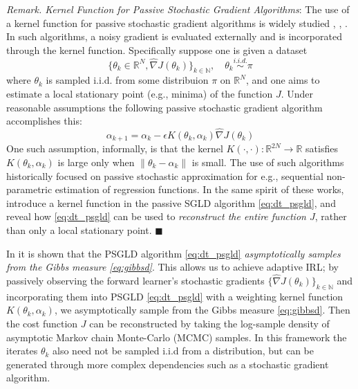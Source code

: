 \documentclass[journal,onecolumn]{IEEEtran}
\newcommand{\alk}{\alpha_k}
\newcommand{\alkk}{\alpha_{k+1}}
\newcommand{\thk}{\theta_k}
\newcommand{\step}{\epsilon}
\newcommand{\gradn}{\hat{\nabla}}
\newcommand{\rew}{J}
\newcommand{\reals}{\mathbb{R}}
\newcommand{\dimn}{N}
\newcommand{\N}{\mathbb{N}}
\begin{document}
\vspace{0.2cm}
\textit{Remark. Kernel Function for Passive Stochastic Gradient Algorithms}: The use of a kernel function for passive stochastic gradient algorithms is widely studied \cite{revesz1977apply} \cite{hardle1987nonparametric}, \cite{nazin1989passive}, \cite{YY96}. In such algorithms, a noisy gradient is evaluated externally and is incorporated through the kernel function. Specifically suppose one is given a dataset \[\{\thk\in\reals^{\dimn},\gradn \rew(\thk)\}_{k\in\N}, \quad \thk \overset{i.i.d.}{\sim} \pi\]
where $\thk$ is sampled i.i.d. from some distribuion $\pi$ on $\reals^{\dimn}$, and one aims to estimate a local stationary point (e.g., minima) of the function $\rew$. {\color{black} Under reasonable assumptions} the following passive stochastic gradient algorithm accomplishes this:
\begin{equation*}
\label{eq:passive_sgd}
    \alkk = \alk - \step K(\thk, \alk)\gradn\rew(\thk)
\end{equation*}
One such assumption, informally, is that the kernel $K(\cdot,\cdot) : \reals^{2\dimn} \to \reals$ satisfies $K(\thk,\alk)$ is large only when $\|\thk-\alk\|$ is small.
The use of such algorithms historically focused on passive stochastic approximation for e.g., sequential non-parametric estimation of regression functions. In the same spirit of these works, \cite{krishnamurthy2021langevin} introduce a kernel function in the passive SGLD algorithm \eqref{eq:dt_psgld}, and reveal how \eqref{eq:dt_psgld} can be used to \textit{reconstruct the entire function $\rew$}, rather than only a local stationary point. $\blacksquare$
\vspace{0.2cm}

In \cite{krishnamurthy2021langevin} it is shown that the PSGLD algorithm \eqref{eq:dt_psgld} \textit{asymptotically samples from the Gibbs measure \eqref{eq:gibbsd}}. This allows us to achieve adaptive IRL; by passively observing the forward learner's stochastic gradients $\{\gradn\rew(\thk)\}_{k\in\N}$ and incorporating them into PSGLD \eqref{eq:dt_psgld} with a weighting kernel function $K(\thk,\alk)$, we asymptotically sample from the Gibbs measure \eqref{eq:gibbsd}. Then the cost function $\rew$ can be reconstructed by taking the log-sample density of asymptotic Markov chain Monte-Carlo (MCMC) samples. In this framework the iterates $\thk$ also need not be sampled i.i.d from a distribution, but can be generated through more complex dependencies such as a stochastic gradient algorithm. 
\end{document}
